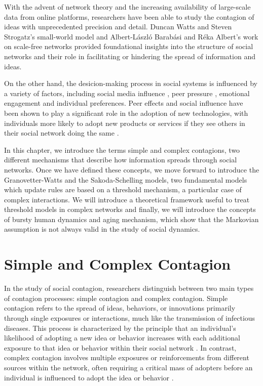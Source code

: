 With the advent of network theory and the increasing availability of large-scale data from online platforms, researchers have been able to study the contagion of ideas with unprecedented precision and detail. Duncan Watts and Steven Strogatz's small-world model \cite{watts1998collective} and Albert-László Barabási and Réka Albert's work on scale-free networks \cite{barabasi2009scale} provided foundational insights into the structure of social networks and their role in facilitating or hindering the spread of information and ideas.

On the other hand, the desicion-making process in social systems is influenced by a variety of factors, including social media influence \cite{online-platforms, jstor}, peer pressure \cite{jensen-2015}, emotional engagement \cite{ferrara-2015, steinert-2022} and individual preferences. Peer effects and social influence have been shown to play a significant role in the adoption of new technologies, with individuals more likely to adopt new products or services if they see others in their social network doing the same \cite{rogers2014, valente-1996, bollinger-2012}.

In this chapter, we introduce the terms simple and complex contagions, two different mechanisms that describe how information spreads through social networks. Once we have defined these concepts, we move forward to introduce the Granovetter-Watts and the Sakoda-Schelling models, two fundamental models which update rules are based on a threshold mechanism, a particular case of complex interactions. We will introduce a theoretical framework useful to treat threshold models in complex networks and finally, we will introduce the concepts of bursty human dynamics and aging mechanism, which show that the Markovian assumption is not always valid in the study of social dynamics.

\section{\label{sec:Simple and Complex Contagion} Simple and Complex Contagion}

In the study of social contagion, researchers distinguish between two main types of contagion processes: simple contagion and complex contagion. Simple contagion refers to the spread of ideas, behaviors, or innovations primarily through single exposures or interactions, much like the transmission of infectious diseases. This process is characterized by the principle that an individual's likelihood of adopting a new idea or behavior increases with each additional exposure to that idea or behavior within their social network \cite{christakis2007spread, fowler2009cooperative}. In contrast, complex contagion involves multiple exposures or reinforcements from different sources within the network, often requiring a critical mass of adopters before an individual is influenced to adopt the idea or behavior \cite{granovetter-1978,centola-2007,centola-2010}.

